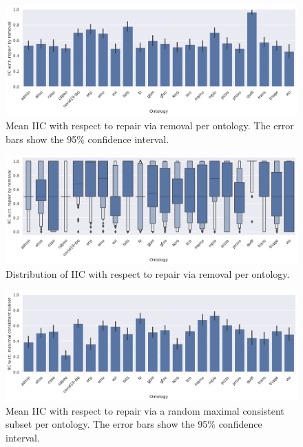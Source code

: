 
\begin{figure}[ht]
  \begin{widepage}
    \centering
    \includegraphics[width=\textwidth]{resources/iic-remove-ontology-bar.png}
  \end{widepage}
  \caption{Mean IIC with respect to repair via removal per ontology. The error bars show the 95\% confidence interval.}
\end{figure}

\begin{figure}[ht]
\begin{widepage}
  \centering
  \includegraphics[width=\textwidth]{resources/iic-remove-ontology-violin.png}
\end{widepage}
\caption{Distribution of IIC with respect to repair via removal per ontology.}
\end{figure}

\begin{figure}[ht]
  \begin{widepage}
    \centering
    \includegraphics[width=\textwidth]{resources/iic-mcs-ontology-bar.png}
  \end{widepage}
  \caption{Mean IIC with respect to repair via a random maximal consistent subset per ontology. The error bars show the 95\% confidence interval.}
\end{figure}

